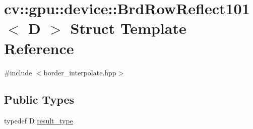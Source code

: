 \hypertarget{structcv_1_1gpu_1_1device_1_1BrdRowReflect101}{\section{cv\-:\-:gpu\-:\-:device\-:\-:Brd\-Row\-Reflect101$<$ D $>$ Struct Template Reference}
\label{structcv_1_1gpu_1_1device_1_1BrdRowReflect101}
}


{\ttfamily \#include $<$border\-\_\-interpolate.\-hpp$>$}

\subsection*{Public Types}
\begin{DoxyCompactItemize}
\item 
typedef D \hyperlink{structcv_1_1gpu_1_1device_1_1BrdRowReflect101_a93315369093ec55b9b390b00a2c6c6cb}{result\-\_\-type}
\end{DoxyCompactItemize}
